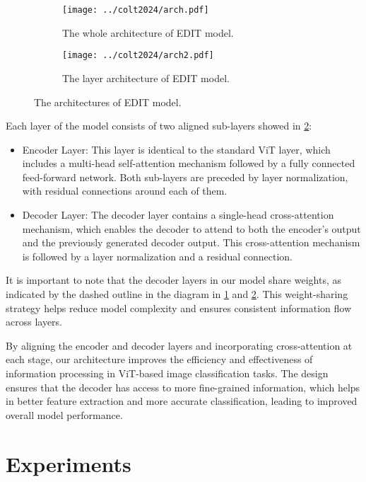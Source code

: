 \begin{figure}
  \centering
  \begin{subfigure}{0.99\linewidth}
    \texttt{[image: ../colt2024/arch.pdf]}
    \caption{The whole architecture of EDIT model.}\label{fig:whole-arch}
  \end{subfigure}
  \vfill
  \begin{subfigure}{0.99\linewidth}
    \texttt{[image: ../colt2024/arch2.pdf]}
    \caption{The layer architecture of EDIT model.}\label{fig:layer-arch}
\end{subfigure}
  \caption{The architectures of EDIT model.}
  \label{fig:arch}
\end{figure}


Each layer of the model consists of two aligned sub-layers showed in \cref{fig:layer-arch}:
\begin{itemize}
  \item Encoder Layer: This layer is identical to the standard ViT layer, which includes a multi-head self-attention mechanism followed by a fully connected feed-forward network. Both sub-layers are preceded by layer normalization, with residual connections around each of them.
  \item Decoder Layer: The decoder layer contains a single-head cross-attention mechanism, which enables the decoder to attend to both the encoder's output and the previously generated decoder output. This cross-attention mechanism is followed by a layer normalization and a residual connection.
\end{itemize}

It is important to note that the decoder layers in our model share weights, as indicated by the dashed outline in the diagram in \cref{fig:whole-arch} and \cref{fig:layer-arch}. This weight-sharing strategy helps reduce model complexity and ensures consistent information flow across layers.

By aligning the encoder and decoder layers and incorporating cross-attention at each stage, our architecture improves the efficiency and effectiveness of information processing in ViT-based image classification tasks. The design ensures that the decoder has access to more fine-grained information, which helps in better feature extraction and more accurate classification, leading to improved overall model performance.


\section{Experiments}

